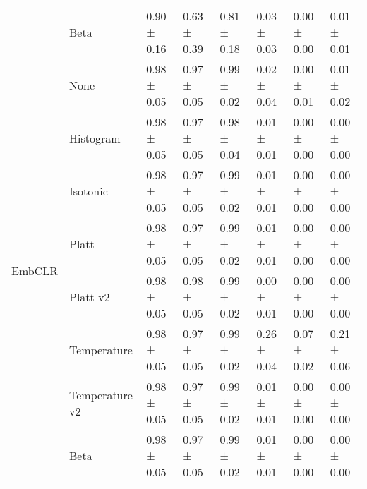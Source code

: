 \begin{tabular}{llllllll}
 & Beta & 0.90 ± 0.16 & 0.63 ± 0.39 & 0.81 ± 0.18 & 0.03 ± 0.03 & 0.00 ± 0.00 & 0.01 ± 0.01 \\
\cline{1-8}
\multirow[t]{8}{*}{EmbCLR} & None & 0.98 ± 0.05 & 0.97 ± 0.05 & 0.99 ± 0.02 & 0.02 ± 0.04 & 0.00 ± 0.01 & 0.01 ± 0.02 \\
 & Histogram & 0.98 ± 0.05 & 0.97 ± 0.05 & 0.98 ± 0.04 & 0.01 ± 0.01 & 0.00 ± 0.00 & 0.00 ± 0.00 \\
 & Isotonic & 0.98 ± 0.05 & 0.97 ± 0.05 & 0.99 ± 0.02 & 0.01 ± 0.01 & 0.00 ± 0.00 & 0.00 ± 0.00 \\
 & Platt & 0.98 ± 0.05 & 0.97 ± 0.05 & 0.99 ± 0.02 & 0.01 ± 0.01 & 0.00 ± 0.00 & 0.00 ± 0.00 \\
 & Platt v2 & 0.98 ± 0.05 & 0.98 ± 0.05 & 0.99 ± 0.02 & 0.00 ± 0.01 & 0.00 ± 0.00 & 0.00 ± 0.00 \\
 & Temperature & 0.98 ± 0.05 & 0.97 ± 0.05 & 0.99 ± 0.02 & 0.26 ± 0.04 & 0.07 ± 0.02 & 0.21 ± 0.06 \\
 & Temperature v2 & 0.98 ± 0.05 & 0.97 ± 0.05 & 0.99 ± 0.02 & 0.01 ± 0.01 & 0.00 ± 0.00 & 0.00 ± 0.00 \\
 & Beta & 0.98 ± 0.05 & 0.97 ± 0.05 & 0.99 ± 0.02 & 0.01 ± 0.01 & 0.00 ± 0.00 & 0.00 ± 0.00 \\
\cline{1-8}
\bottomrule
\end{tabular}
